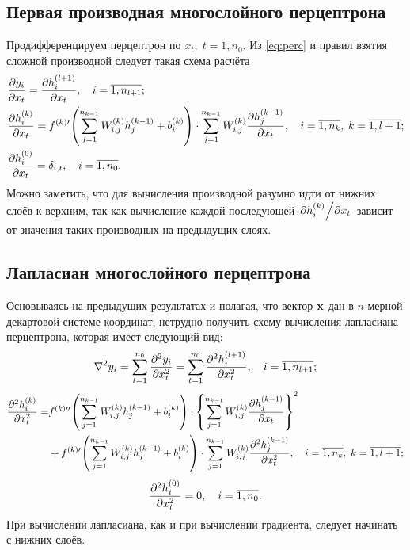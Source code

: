 \documentclass[11pt]{article}
\begin{document}
\subsection{Первая производная многослойного перцептрона}

Продифференцируем перцептрон по $x_t,\; t=\overline{1,n_0}$. Из \eqref{eq:perc} и правил взятия сложной производной следует такая схема расчёта
\begin{equation}
    \begin{split}
        &\pdv{y_i}{x_t} = \pdv{h^{(l+1)}_i}{x_t},\quad i=\overline{1,n_{l+1}};        
        \\
        & \pdv{h^{(k)}_i}{x_t} = f^{(k)\prime}\qty(\sum_{j=1}^{n_{k-1}} W^{(k)}_{i,j} h^{(k-1)}_j + b^{(k)}_i) \cdot \sum_{j=1}^{n_{k-1}} W^{(k)}_{i,j} \pdv{h^{(k-1)}_j}{x_t},\quad i=\overline{1,n_k},\; k = \overline{1, l+1};\\
        & \pdv{h^{(0)}_i}{x_t} = \delta_{i,t},\quad i=\overline{1,n_0}.
    \end{split}
\end{equation}
Можно заметить, что для вычисления производной разумно идти от нижних слоёв к верхним, так как вычисление каждой последующей $\pdv*{h^{(k)}_i}{x_t}$ зависит от значения таких производных на предыдущих слоях.

\subsection{Лапласиан многослойного перцептрона}

Основываясь на предыдущих результатах и полагая, что вектор $\vb{x}$ дан в $n$-мерной декартовой системе координат, нетрудно получить схему вычисления лапласиана перцептрона, которая имеет следующий вид:
\begin{equation}
    \laplacian y_i = \sum_{t=1}^{n_0} \pdv[2]{y_i}{x_t} = \sum_{t=1}^{n_0}\pdv[2]{h^{(l+1)}_i}{x_t},\quad i=\overline{1,n_{l+1}};
\end{equation}
\begin{equation}
    \begin{split}
        \pdv[2]{h^{(k)}_i}{x_t} = & f^{(k)\prime\prime}\qty(\sum_{j=1}^{n_{k-1}} W^{(k)}_{i,j} h^{(k-1)}_j + b^{(k)}_i) \cdot \qty{\sum_{j=1}^{n_{k-1}} W^{(k)}_{i,j} \pdv{h^{(k-1)}_j}{x_t}}^2\\
        &+ f^{(k)\prime}\qty(\sum_{j=1}^{n_{k-1}} W^{(k)}_{i,j} h^{(k-1)}_j + b^{(k)}_i) \cdot \sum_{j=1}^{n_{k-1}} W^{(k)}_{i,j} \pdv[2]{h^{(k-1)}_j}{x_t},\quad i=\overline{1,n_k},\; k = \overline{1, l+1};
    \end{split}
\end{equation}
\begin{equation}
    \pdv[2]{h^{(0)}_i}{x_t} = 0,\quad i=\overline{1,n_0}.
\end{equation}
При вычислении лапласиана, как и при вычислении градиента, следует начинать с нижних слоёв.
\end{document}
